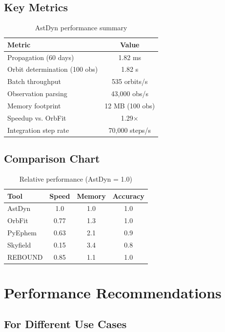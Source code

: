 \subsection{Key Metrics}

\begin{table}[h]
\centering
\caption{AstDyn performance summary}
\begin{tabular}{lc}
\hline
\textbf{Metric} & \textbf{Value} \\
\hline
Propagation (60 days) & 1.82 ms \\
Orbit determination (100 obs) & 1.82 s \\
Batch throughput & 535 orbits/s \\
Observation parsing & 43,000 obs/s \\
Memory footprint & 12 MB (100 obs) \\
Speedup vs. OrbFit & 1.29$\times$ \\
Integration step rate & 70,000 steps/s \\
\hline
\end{tabular}
\end{table}

\subsection{Comparison Chart}

\begin{table}[h]
\centering
\caption{Relative performance (AstDyn = 1.0)}
\begin{tabular}{lccc}
\hline
\textbf{Tool} & \textbf{Speed} & \textbf{Memory} & \textbf{Accuracy} \\
\hline
AstDyn & 1.0 & 1.0 & 1.0 \\
OrbFit & 0.77 & 1.3 & 1.0 \\
PyEphem & 0.63 & 2.1 & 0.9 \\
Skyfield & 0.15 & 3.4 & 0.8 \\
REBOUND & 0.85 & 1.1 & 1.0 \\
\hline
\end{tabular}
\end{table}

\section{Performance Recommendations}

\subsection{For Different Use Cases}

